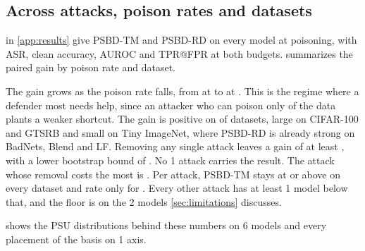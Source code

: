 \subsection{Across attacks, poison rates and datasets}
\label{sec:results:headline}

 in \cref{app:results} give PSBD-TM and PSBD-RD on every model at \PanelRates{} poisoning, with ASR, clean accuracy, AUROC and TPR@FPR at both budgets.  summarizes the paired gain by poison rate and dataset.



The gain grows as the poison rate falls, from \GainsHighestRate{} at \PanelRateHigh{} to \GainsLowestRate{} at \PanelRateLow{}. This is the regime where a defender most needs help, since an attacker who can poison only \PanelRateLow{} of the data plants a weaker shortcut. The gain is positive on \GainsPositiveDatasets{} of \GainsDatasets{} datasets, large on CIFAR-100 and GTSRB and small on Tiny ImageNet, where PSBD-RD is already strong on BadNets, Blend and LF. Removing any single attack leaves a gain of at least \GainsLeaveOneAttackOut{}, with a lower bootstrap bound of \GainsLeaveOneAttackOutLow{}. No 1 attack carries the result. The attack whose removal costs the most is \GainsLeaveOneAttackOutAttack{}. Per attack, PSBD-TM stays at or above \GainsStrongAuroc{} on every dataset and rate only for \GainsStrongAttacks{}. Every other attack has at least 1 model below that, and the floor is \HeadlineFloorAuroc{} on the 2 models \cref{sec:limitations} discusses.

 shows the PSU distributions behind these numbers on 6 models and every placement of the basis on 1 axis.
